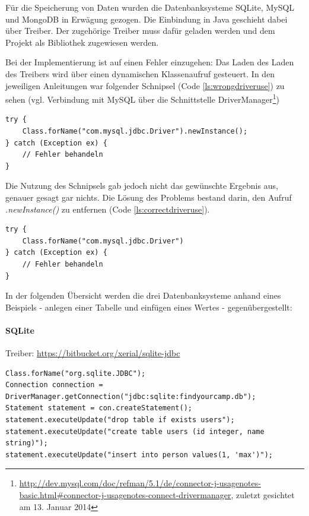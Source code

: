Für die Speicherung von Daten wurden die Datenbanksysteme SQLite, MySQL und MongoDB in Erwägung gezogen. Die Einbindung in Java geschieht dabei über Treiber. Der zugehörige Treiber  muss dafür geladen werden und dem Projekt als Bibliothek zugewiesen werden.

Bei der Implementierung ist auf einen Fehler einzugehen: Das Laden des Laden des Treibers wird über einen dynamischen Klassenaufruf gesteuert. In den jeweiligen Anleitungen war folgender Schnipsel (Code \ref{ls:wrongdriveruse}) zu sehen (vgl. Verbindung mit MySQL über die Schnittstelle DriverManager\footnote{\url{http://dev.mysql.com/doc/refman/5.1/de/connector-j-usagenotes-basic.html\#connector-j-usagenotes-connect-drivermanager}, zuletzt gesichtet am 13. Januar 2014})

\begin{lstlisting}[label=ls:wrongdriveruse,caption=Fehlerhafter dynamischer Klassenaufruf]
try {
	Class.forName("com.mysql.jdbc.Driver").newInstance();
} catch (Exception ex) {
	// Fehler behandeln
}
\end{lstlisting}

Die Nutzung des Schnipsels gab jedoch nicht das gewünschte Ergebnis aus, genauer gesagt gar nichts. Die Lösung des Problems bestand darin, den Aufruf \textit{.newInstance()} zu entfernen (Code \ref{ls:correctdriveruse}).

\begin{lstlisting}[label=ls:correctdriveruse,caption=Korrekter dynamischer Klassenaufruf]
try {
	Class.forName("com.mysql.jdbc.Driver")
} catch (Exception ex) {
	// Fehler behandeln
}
\end{lstlisting}

In der folgenden Übersicht werden die drei Datenbanksysteme anhand eines Beispiels - anlegen einer Tabelle und einfügen eines Wertes - gegenübergestellt:

\paragraph{SQLite}

Treiber: \url{https://bitbucket.org/xerial/sqlite-jdbc}
\begin{lstlisting}[label=ls:sqliteexample,caption=Exemplarische Darstellung der Nutzung des SQLite Treibers]
Class.forName("org.sqlite.JDBC");
Connection connection = DriverManager.getConnection("jdbc:sqlite:findyourcamp.db");
Statement statement = con.createStatement();
statement.executeUpdate("drop table if exists users");
statement.executeUpdate("create table users (id integer, name string)");
statement.executeUpdate("insert into person values(1, 'max')");
\end{lstlisting}

